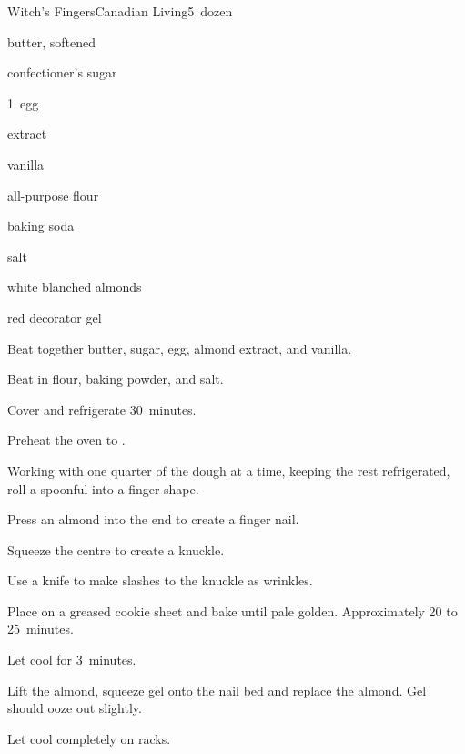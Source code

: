 \begin{recipe}{Witch's Fingers}{Canadian Living}{5~dozen}

\begin{ingredients}
\item {} butter, softened
\item {} confectioner's sugar
\item 1~egg
\item {}  extract
\item {} vanilla
\item \C{2\threequarter} all-purpose flour
\item {} baking soda
\item {} salt
\item \C{\threequarter} white blanched almonds
\item red decorator gel
\end{ingredients}

\begin{directions}
\item Beat together butter, sugar, egg, almond extract, and vanilla.
\item Beat in flour, baking powder, and salt.
\item Cover and refrigerate 30~minutes.
\item Preheat the oven to .
\item Working with one quarter of the dough at a time, keeping the rest refrigerated, roll a spoonful into a finger shape.
\item Press an almond into the end to create a finger nail.
\item Squeeze the centre to create a knuckle.
\item Use a knife to make slashes to the knuckle as wrinkles.
\item Place on a greased cookie sheet and bake until pale golden. Approximately 20 to 25~minutes.
\item Let cool for 3~minutes.
\item Lift the almond, squeeze gel onto the nail bed and replace the almond. Gel should ooze out slightly.
\item Let cool completely on racks.
\end{directions}

\end{recipe}
